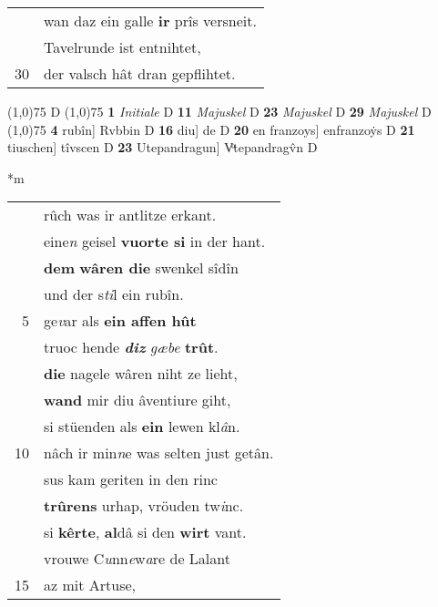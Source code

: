 \documentclass[8pt,a4paper,notitlepage]{article}
\begin{document}
\begin{table}[ht]
\begin{minipage}[t]{0.5\linewidth}
\begin{tabular}{rl}
 & wan daz ein galle \textbf{ir} prîs versneit.\\ 
 & Tavelrunde ist entnihtet,\\ 
30 & der valsch hât dran gepflihtet.\\ 
\end{tabular}
\scriptsize
\line(1,0){75} \newline
D \newline
\line(1,0){75} \newline
\textbf{1} \textit{Initiale} D  \textbf{11} \textit{Majuskel} D  \textbf{23} \textit{Majuskel} D  \textbf{29} \textit{Majuskel} D  \newline
\line(1,0){75} \newline
\textbf{4} rubîn] Rvbbin D \textbf{16} diu] de D \textbf{20} en franzoys] enfranzoẏs D \textbf{21} tiuschen] tîvscen D \textbf{23} Utepandragun] Vͦtepandragv̂n D \newline
\end{minipage}
\hspace{0.5cm}
\begin{minipage}[t]{0.5\linewidth}
\small
\begin{center}*m
\end{center}
\begin{tabular}{rl}
 & rûch was ir antlitze erkant.\\ 
 & eine\textit{n} geisel \textbf{vuorte si} in der hant.\\ 
 & \textbf{dem} \textbf{wâren die} swenkel sîdîn\\ 
 & und der s\textit{ti}l ein rubîn.\\ 
5 & ge\textit{v}ar als \textbf{ein affen hût}\\ 
 & truoc hende \textit{\textbf{diz}} \textit{gæbe} \textbf{trût}.\\ 
 & \textbf{die} nagele wâren niht ze lieht,\\ 
 & \textbf{wand} mir diu âventiure giht,\\ 
 & si stüenden als \textbf{ein} lewen kl\textit{â}n.\\ 
10 & nâch ir min\textit{n}e was selten just getân.\\ 
 & sus kam geriten in den rinc\\ 
 & \textbf{trûrens} urhap, vröuden tw\textit{i}nc.\\ 
 & si \textbf{kêrte}, \textbf{al}dâ si den \textbf{wirt} vant.\\ 
 & vrouwe C\textit{u}nn\textit{e}w\textit{a}re de Lalant\\ 
15 & az mit Artuse,\\ 

\end{tabular}
\end{minipage}
\end{table}
\end{document}
